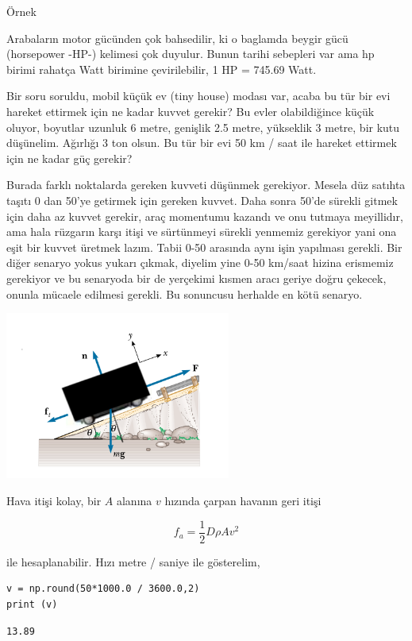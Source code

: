 \documentclass[12pt,fleqn]{article}\usepackage{../../common}
\begin{document}
Örnek

Arabaların motor gücünden çok bahsedilir, ki o baglamda beygir gücü (horsepower
-HP-) kelimesi çok duyulur. Bunun tarihi sebepleri var ama hp birimi rahatça
Watt birimine çevirilebilir, 1 HP = 745.69 Watt.

Bir soru soruldu, mobil küçük ev (tiny house) modası var, acaba bu tür bir evi
hareket ettirmek için ne kadar kuvvet gerekir? Bu evler olabildiğince küçük
oluyor, boyutlar uzunluk 6 metre, genişlik 2.5 metre, yükseklik 3 metre, bir
kutu düşünelim. Ağırlığı 3 ton olsun. Bu tür bir evi 50 km / saat ile hareket
ettirmek için ne kadar güç gerekir?

Burada farklı noktalarda gereken kuvveti düşünmek gerekiyor. Mesela düz satıhta
taşıtı 0 dan 50'ye getirmek için gereken kuvvet. Daha sonra 50'de sürekli gitmek
için daha az kuvvet gerekir, araç momentumu kazandı ve onu tutmaya meyillidır,
ama hala rüzgarın karşı itişi ve sürtünmeyi sürekli yenmemiz gerekiyor yani ona
eşit bir kuvvet üretmek lazım. Tabii 0-50 arasında aynı işin yapılması
gerekli. Bir diğer senaryo yokus yukarı çıkmak, diyelim yine 0-50 km/saat hizina
erismemiz gerekiyor ve bu senaryoda bir de yerçekimi kısmen aracı geriye doğru
çekecek, onunla mücaele edilmesi gerekli. Bu sonuncusu herhalde en kötü senaryo.

\includegraphics[width=20em]{phy_005_basics_07.png}

Hava itişi kolay, bir $A$ alanına $v$ hızında çarpan havanın geri itişi

$$
f_a = \frac{1}{2} D \rho A v^2
$$

ile hesaplanabilir. Hızı metre / saniye ile gösterelim,

\begin{verbatim}
v = np.round(50*1000.0 / 3600.0,2)
print (v)
\end{verbatim}

\begin{verbatim}
13.89
\end{verbatim}
\end{document}
